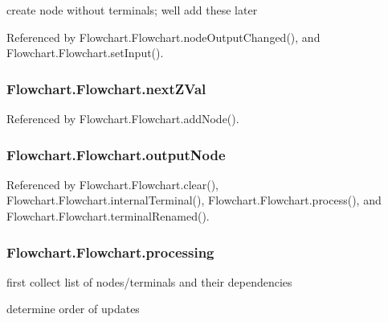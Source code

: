 create node without terminals; we\textquotesingle{}ll add these later 



Referenced by Flowchart.\+Flowchart.\+node\+Output\+Changed(), and Flowchart.\+Flowchart.\+set\+Input().

\hypertarget{classFlowchart_1_1Flowchart_a5f0e24985b1b2e763104f6f3a0e7d36d}{}
\subsubsection[{next\+Z\+Val}]{\setlength{\rightskip}{0pt plus 5cm}Flowchart.\+Flowchart.\+next\+Z\+Val}\label{classFlowchart_1_1Flowchart_a5f0e24985b1b2e763104f6f3a0e7d36d}


Referenced by Flowchart.\+Flowchart.\+add\+Node().

\hypertarget{classFlowchart_1_1Flowchart_a40f1e9146fe716f08de3e409e928cfd0}{}
\subsubsection[{output\+Node}]{\setlength{\rightskip}{0pt plus 5cm}Flowchart.\+Flowchart.\+output\+Node}\label{classFlowchart_1_1Flowchart_a40f1e9146fe716f08de3e409e928cfd0}


Referenced by Flowchart.\+Flowchart.\+clear(), Flowchart.\+Flowchart.\+internal\+Terminal(), Flowchart.\+Flowchart.\+process(), and Flowchart.\+Flowchart.\+terminal\+Renamed().

\hypertarget{classFlowchart_1_1Flowchart_a7a15f175c575286a959cf951028df731}{}
\subsubsection[{processing}]{\setlength{\rightskip}{0pt plus 5cm}Flowchart.\+Flowchart.\+processing}\label{classFlowchart_1_1Flowchart_a7a15f175c575286a959cf951028df731}


first collect list of nodes/terminals and their dependencies 

determine order of updates

